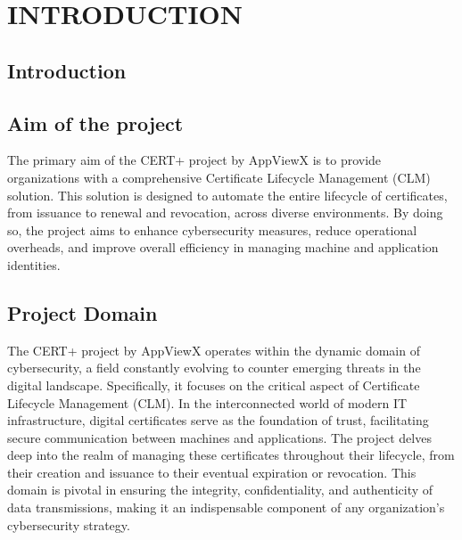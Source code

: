\documentclass[10pt]{report}
\begin{document}
\newpage
\renewcommand*\contentsname{TABLE OF CONTENTS}
\tableofcontents
{}
\thispagestyle{empty}
\chapter{INTRODUCTION}
\section{Introduction}
\hspace{0.5cm}{In today's digital landscape, the secure management of machine and application identities is a critical aspect of any organization's cybersecurity strategy. With the increasing complexity of IT environments, there arises a need for efficient and scalable solutions to manage certificate lifecycles effectively. CERT+ by AppViewX addresses this challenge by offering a ready-to-consume solution that streamlines the automation and management of certificates, ensuring a robust and secure infrastructure.}
\color{black}
\linespread{1.5}
\section{Aim of the project}
\hspace{0.5cm}The primary aim of the CERT+ project by AppViewX is to provide organizations with a comprehensive Certificate Lifecycle Management (CLM) solution. This solution is designed to automate the entire lifecycle of certificates, from issuance to renewal and revocation, across diverse environments. By doing so, the project aims to enhance cybersecurity measures, reduce operational overheads, and improve overall efficiency in managing machine and application identities.
\section{Project Domain}
The CERT+ project by AppViewX operates within the dynamic domain of cybersecurity, a field constantly evolving to counter emerging threats in the digital landscape. Specifically, it focuses on the critical aspect of Certificate Lifecycle Management (CLM). In the interconnected world of modern IT infrastructure, digital certificates serve as the foundation of trust, facilitating secure communication between machines and applications. The project delves deep into the realm of managing these certificates throughout their lifecycle, from their creation and issuance to their eventual expiration or revocation. This domain is pivotal in ensuring the integrity, confidentiality, and authenticity of data transmissions, making it an indispensable component of any organization's cybersecurity strategy.
\end{document}
